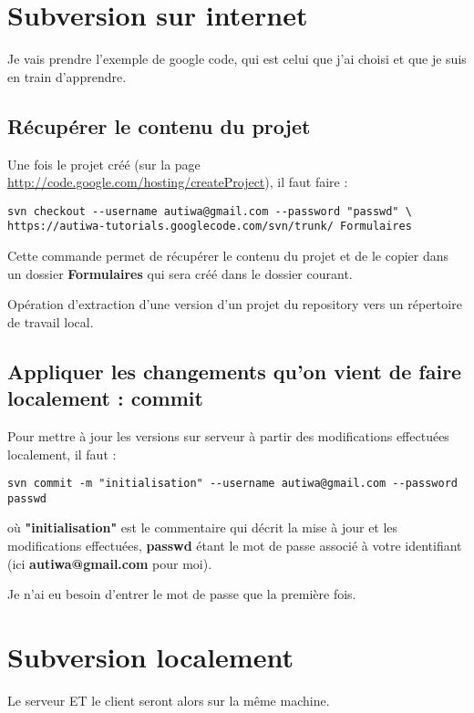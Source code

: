 \documentclass[a4paper,twoside]{article}
\begin{document}
\section{Subversion sur internet}
Je vais prendre l'exemple de google code, qui est celui que j'ai choisi et que je suis en train d'apprendre.

\subsection{Récupérer le contenu du projet}\label{sec:checkout}
Une fois le projet créé (sur la page \url{http://code.google.com/hosting/createProject}), il faut faire : 
\begin{verbatim}
svn checkout --username autiwa@gmail.com --password "passwd" \
https://autiwa-tutorials.googlecode.com/svn/trunk/ Formulaires
\end{verbatim}

Cette commande permet de récupérer le contenu du projet et de le copier dans un dossier \textbf{Formulaires} qui sera créé dans le dossier courant.

\begin{definition}[Checkout]
Opération d'extraction d'une version d'un projet du repository vers un répertoire de travail local.
\end{definition}


\subsection{Appliquer les changements qu'on vient de faire localement : commit}\label{sec:commit}

Pour mettre à jour les versions sur serveur à partir des modifications effectuées localement, il faut : 
\begin{verbatim}
svn commit -m "initialisation" --username autiwa@gmail.com --password passwd
\end{verbatim}
où \textbf{"initialisation"} est le commentaire qui décrit la mise à jour et les modifications effectuées, \textbf{passwd} étant le mot de passe associé à votre identifiant (ici \textbf{autiwa@gmail.com} pour moi).

\begin{remarque}
Je n'ai eu besoin d'entrer le mot de passe que la première fois.
\end{remarque}

\section{Subversion localement}
Le serveur ET le client seront alors sur la même machine.
\end{document}
